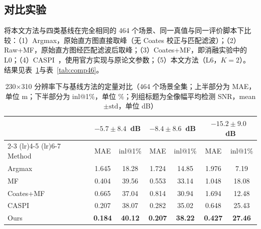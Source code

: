 \subsection{对比实验}
\label{sec:comparison}

将本文方法与四类基线在完全相同的 464 个场景、同一真值与同一评价脚本下比较：（1）Argmax，原始直方图直接取峰（无 Coates 校正与匹配滤波）；（2）Raw+MF，原始直方图经匹配滤波后取峰；（3）Coates+MF，即消融实验中的 L0；（4）CASPI~\cite{caspi}，使用官方实现与原论文参数；（5）本文方法（L6，$K=2$）。结果见表~\ref{tab:comp230}与表~\ref{tab:comp46}。

\begin{table}[t]
\centering
\caption{230×310 分辨率下与基线方法的定量对比（464 个场景全集；上半部分为 MAE，单位 m；下半部分为 inl@1\%，单位 \%；列组标题为全像幅平均检测 SNR，mean$\pm\mathrm{std}$，单位 dB）}
\label{tab:comp230}\scriptsize\setlength{\tabcolsep}{6.5pt}
\begin{tabular}{l cc cc cc}
\toprule
 & \multicolumn{2}{c}{$-5.7 \pm 8.4$~dB} & \multicolumn{2}{c}{$-8.4 \pm 8.6$~dB} & \multicolumn{2}{c}{$-15.2 \pm 9.0$~dB} \\
\cmidrule(lr){2-3} \cmidrule(lr){4-5} \cmidrule(lr){6-7}
Method & MAE & inl@1\% & MAE & inl@1\% & MAE & inl@1\% \\
\midrule
Argmax    & 1.645 & 18.28 & 1.724 & 14.85 & 1.976 & 7.19 \\
MF        & 0.404 & 39.56 & 0.553 & 33.14 & 1.048 & 18.08 \\
Coates+MF & 0.665 & 37.04 & 0.814 & 30.94 & 1.694 & 12.48 \\
CASPI     & 0.207 & 38.07 & 0.282 & 35.02 & 0.648 & 25.43 \\
Ours      & \textbf{0.184} & \textbf{40.12} & \textbf{0.207} & \textbf{38.22} & \textbf{0.427} & \textbf{27.46} \\
\bottomrule
\end{tabular}
\end{table}

